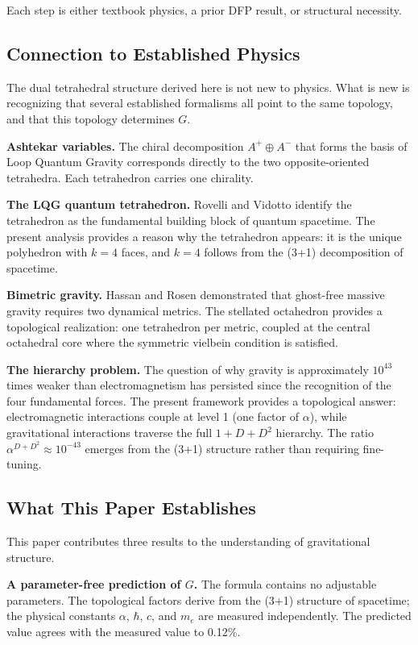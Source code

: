 \documentclass[aps,prd,preprint,superscriptaddress,showpacs,preprintnumbers,amsmath,amssymb,nofootinbib]{revtex4-2}
\begin{document}
Each step is either textbook physics, a prior DFP result, or structural necessity.

\subsection{Connection to Established Physics}
\label{subsec:standard-results}

The dual tetrahedral structure derived here is not new to physics. What is new is recognizing that several established formalisms all point to the same topology, and that this topology determines $G$.

\textbf{Ashtekar variables.} The chiral decomposition $A^+ \oplus A^-$ that forms the basis of Loop Quantum Gravity corresponds directly to the two opposite-oriented tetrahedra. Each tetrahedron carries one chirality.

\textbf{The LQG quantum tetrahedron.} Rovelli and Vidotto identify the tetrahedron as the fundamental building block of quantum spacetime. The present analysis provides a reason why the tetrahedron appears: it is the unique polyhedron with $k = 4$ faces, and $k = 4$ follows from the (3+1) decomposition of spacetime.

\textbf{Bimetric gravity.} Hassan and Rosen demonstrated that ghost-free massive gravity requires two dynamical metrics. The stellated octahedron provides a topological realization: one tetrahedron per metric, coupled at the central octahedral core where the symmetric vielbein condition is satisfied.

\textbf{The hierarchy problem.} The question of why gravity is approximately $10^{43}$ times weaker than electromagnetism has persisted since the recognition of the four fundamental forces. The present framework provides a topological answer: electromagnetic interactions couple at level 1 (one factor of $\alpha$), while gravitational interactions traverse the full $1 + D + D^2$ hierarchy. The ratio $\alpha^{D+D^2} \approx 10^{-43}$ emerges from the (3+1) structure rather than requiring fine-tuning.

\subsection{What This Paper Establishes}
\label{subsec:achievements}

This paper contributes three results to the understanding of gravitational structure.

\textbf{A parameter-free prediction of $G$.} The formula contains no adjustable parameters. The topological factors derive from the (3+1) structure of spacetime; the physical constants $\alpha$, $\hbar$, $c$, and $m_e$ are measured independently. The predicted value agrees with the measured value to 0.12\%.
\end{document}
